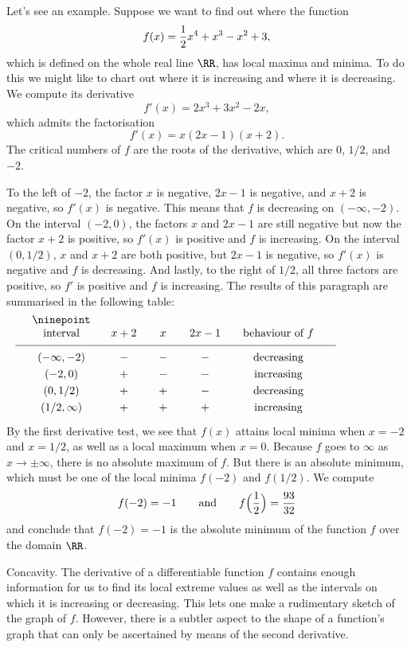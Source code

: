 Let's see an example. Suppose we want to find out where the function
$$f(x) = {1\over 2}x^4 + x^3 - x^2 + 3,$$
which is defined on the whole real line $\RR$, has local maxima and minima.
To do this we might like to chart out where it is increasing and where it is decreasing.
We compute its derivative
$$f'(x) = 2x^3 + 3x^2 - 2x,$$
which admits the factorisation
$$f'(x) = x(2x-1)(x+2).$$
The critical numbers of $f$ are the roots of the derivative, which are $0$, $1/2$, and $-2$.

To the left of $-2$, the factor $x$ is negative, $2x-1$ is negative,
and $x+2$ is negative, so $f'(x)$ is negative. This means that $f$ is decreasing on $(-\infty, -2)$.
On the interval $(-2,0)$, the factors $x$ and $2x-1$ are still negative but now the factor $x+2$ is positive,
so $f'(x)$ is positive and $f$ is increasing.
On the interval $(0,1/2)$, $x$ and $x+2$ are both positive, but $2x-1$ is negative,
so $f'(x)$ is negative and $f$ is decreasing. And lastly, to the right of $1/2$, all three factors are
positive, so $f'$ is positive and $f$ is increasing. The results of this paragraph are summarised in the
following table:
$$
\vbox{\ninepoint
\tabskip=2em plus.2em minus .2em
\halign{
\hfil $#$ \hfil & \hfil$#$\hfil & \hfil$#$\hfil & \hfil$#$\hfil  & \hfil#\hfil\cr
\hbox{interval} & x+2 & x & 2x-1 & behaviour of $f$\cr
\noalign{\medskip}
\noalign{\hrule}
\noalign{\medskip}
(-\infty, -2) & - & - & - & decreasing\cr
\noalign{\smallskip}
(-2,0)        & + & - & - & increasing\cr
\noalign{\smallskip}
(0,1/2) & + & + & - & decreasing\cr
\noalign{\smallskip}
(1/2,\infty) & + & + & + & increasing\cr
}}
$$
By the first derivative test, we see that $f(x)$ attains local minima when $x=-2$ and $x=1/2$,
as well as a local maximum when $x=0$. Because $f$ goes to $\infty$ as $x\to \pm\infty$, there is no
absolute maximum of $f$. But there is an absolute minimum, which must be one of the local minima
$f(-2)$ and $f(1/2)$. We compute
$$f(-2) = -1\qquad\hbox{and}\qquad f\Bigl({1\over 2}\Bigr) = {93\over 32}$$
and conclude that $f(-2) = -1$ is the absolute minimum of the function $f$ over the domain $\RR$.

\medskip\boldlabel {} Concavity.
The derivative of a differentiable function $f$ contains enough information
for us to find its local extreme values as well as the intervals on which it is increasing or decreasing.
This lets one make a rudimentary sketch of the graph of $f$. However, there is a subtler aspect to the shape
of a function's graph that can only be ascertained by means of the second derivative.

